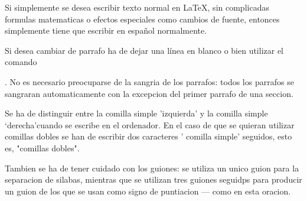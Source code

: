 Si simplemente se desea escribir texto normal en LaTeX, 
sin complicadas formulas matematicas o efectos especiales
como cambios de fuente, entonces simplemente tiene que escribir 
en espa\~nol normalmente. \par
Si desea cambiar de parrafo ha de dejar una línea en blanco o bien
utilizar el comando \par.
No es necesario preocuparse de la sangria de los parrafos:
todos los parrafos se sangraran automaticamente con la excepcion
del primer parrafo de una seccion.

Se ha de distinguir entre la comilla simple 'izquierda'
y la comilla simple `derecha'cuando se escribe en el ordenador.
En el caso de que se quieran utilizar comillas dobles se han de 
escribir dos caracteres ' comilla simple' seguidos, esto es, 
"comillas dobles".

Tambien se ha de tener cuidado con los guiones: se utiliza un unico 
guion para la separacion de silabas, mientras que se utilizan
tres guiones seguidps para producir un guion de los que se usan como signo de puntiacion --- como en esta oracion.

